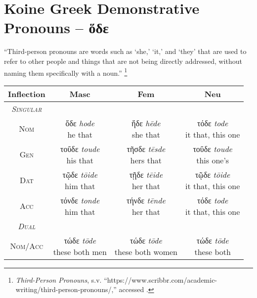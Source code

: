 \documentclass[10pt]{memoir}
\newcommand{\tsc}[1]{\textsc{#1}}
\newcommand{\grc}[1]{\fontspec{Inter}#1}
\newcommand{\trc}[1]{\textit{\fontspec{Tinos}#1}}
\newcommand{\linkfoot}[3]{\footnote{\emph{#1}, s.v. ``{#2},'' accessed \printdate{#3}.}}
\begin{document}
    \section*{Koine Greek Demonstrative Pronouns -- \grc{ὅδε}}

    ``Third-person pronouns are words such as `she,' `it,' and `they' that are used to refer to other people and things that are not being directly addressed, without naming them specifically with a noun.''
    \linkfoot{Third-Person Pronouns}{https://www.scribbr.com/academic-writing/third-person-pronouns/}{2025-05-13}

    \begin{table}[H]
        \begin{tabular}{c|ccc}
            \textbf{Inflection} & \textbf{Masc} & \textbf{Fem} & \textbf{Neu} \\
            \hline
            \emph{\tsc{Singular}} \\
            \tsc{Nom} & \makecell{\grc{ὅδε} \trc{hode} \\ \small he that} & \makecell{\grc{ἥδε} \trc{hēde} \\ \small she that} & \makecell{\grc{τόδε} \trc{tode} \\ \small it that, this one} \\
            \tsc{Gen} & \makecell{\grc{τοῦδε} \trc{toude} \\ \small his that} & \makecell{\grc{τῆσδε} \trc{tēsde} \\ \small hers that} & \makecell{\grc{τοῦδε} \trc{toude} \\ \small this one's} \\
            \tsc{Dat} & \makecell{\grc{τῷδε} \trc{tōide} \\ \small him that} & \makecell{\grc{τῇδε} \trc{tēide} \\ \small her that} & \makecell{\grc{τῷδε} \trc{tōide} \\ \small it that, this one} \\
            \tsc{Acc} & \makecell{\grc{τόνδε} \trc{tonde} \\ \small him that} & \makecell{\grc{τήνδε} \trc{tēnde} \\ \small her that} & \makecell{\grc{τόδε} \trc{tode} \\ \small it that, this one} \\
            \hline
            \emph{\tsc{Dual}} \\
            \tsc{Nom/Acc} & \makecell{\grc{τώδε} \trc{tōde} \\ \small these both men} & \makecell{\grc{τώδε} \trc{tōde} \\ \small these both women} & \makecell{\grc{τώδε} \trc{tōde} \\ \small these both} \\

\end{tabular}
\end{table}
\end{document}
